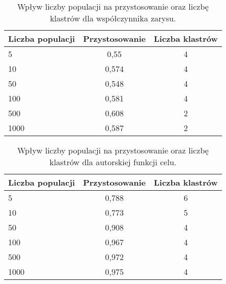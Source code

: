\documentclass{classrep}
\begin{document}
\begin{table}[H]
\centering
\caption{Wpływ liczby populacji na przystosowanie oraz liczbę klastrów dla współczynnika zarysu.}
\begin{tabular}{|l|c|c|}
\hline
\textbf{Liczba populacji} & \multicolumn{1}{l|}{\textbf{Przystosowanie}} & \multicolumn{1}{l|}{\textbf{Liczba klastrów}} \\ \hline
5                         &  0,55                                     & 4                                            \\ \hline
10                        & 0,574                                     & 4                                            \\ \hline
50                        & 0,548                                     & 4                                            \\ \hline
100                       & 0,581                                     & 4                                            \\ \hline
500                       & 0,608                                     & 2                                            \\ \hline
1000                      & 0,587                                     & 2                                            \\ \hline
\end{tabular}
\label{tab:calc4_1}
\end{table}

\begin{table}[H]
\centering
\caption{Wpływ liczby populacji na przystosowanie oraz liczbę klastrów dla autorskiej funkcji celu.}
\begin{tabular}{|l|c|c|}
\hline
\textbf{Liczba populacji} & \multicolumn{1}{l|}{\textbf{Przystosowanie}} & \multicolumn{1}{l|}{\textbf{Liczba klastrów}} \\ \hline
5                         & 0,788                                     & 6                                            \\ \hline
10                        & 0,773                                     & 5                                            \\ \hline
50                        & 0,908                                     & 4                                            \\ \hline
100                       & 0,967                                     & 4                                            \\ \hline
500                       & 0,972                                     & 4                                            \\ \hline
1000                      & 0,975                                     & 4                                            \\ \hline
\end{tabular}
\label{tab:calc4_2}
\end{table}
\end{document}
